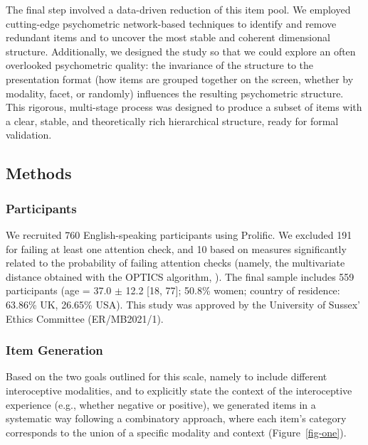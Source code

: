 \documentclass[
  jou,
  floatsintext,
  longtable,
  nolmodern,
  notxfonts,
  notimes,
  colorlinks=true,linkcolor=blue,citecolor=blue,urlcolor=blue]{apa7}
\begin{document}
The final step involved a data-driven reduction of this item pool. We
employed cutting-edge psychometric network-based techniques to identify
and remove redundant items and to uncover the most stable and coherent
dimensional structure. Additionally, we designed the study so that we
could explore an often overlooked psychometric quality: the invariance
of the structure to the presentation format (how items are grouped
together on the screen, whether by modality, facet, or randomly)
influences the resulting psychometric structure. This rigorous,
multi-stage process was designed to produce a subset of items with a
clear, stable, and theoretically rich hierarchical structure, ready for
formal validation.

\subsection{Methods}\label{methods}

\subsubsection{Participants}\label{participants}

We recruited 760 English-speaking participants using
Prolific\textcopyright. We excluded 191 for failing at least one
attention check, and 10 based on measures significantly related to the
probability of failing attention checks (namely, the multivariate
distance obtained with the OPTICS algorithm,
). The final
sample includes 559 participants (age = 37.0 \(\pm\) 12.2 {[}18, 77{]};
50.8\% women; country of residence: 63.86\% UK, 26.65\% USA). This study
was approved by the University of Sussex' Ethics Committee
(ER/MB2021/1).

\subsubsection{Item Generation}\label{item-generation}

Based on the two goals outlined for this scale, namely to include
different interoceptive modalities, and to explicitly state the context
of the interoceptive experience (e.g., whether negative or positive), we
generated items in a systematic way following a combinatory approach,
where each item's category corresponds to the union of a specific
modality and context (Figure~\ref{fig-one}).
\end{document}
